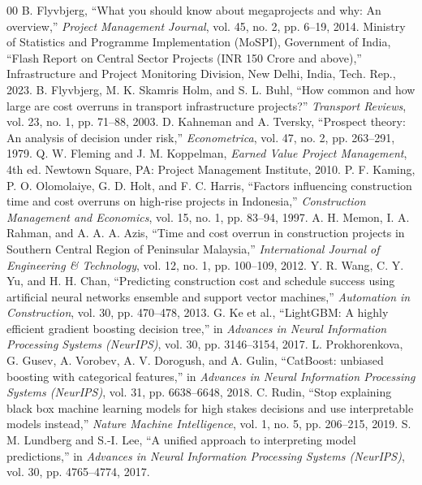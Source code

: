 \documentclass[conference]{IEEEtran}
\begin{document}
\begin{thebibliography}{00}
 B. Flyvbjerg, ``What you should know about megaprojects and why: An overview,'' \textit{Project Management Journal}, vol. 45, no. 2, pp. 6--19, 2014.
 Ministry of Statistics and Programme Implementation (MoSPI), Government of India, ``Flash Report on Central Sector Projects (INR 150 Crore and above),'' Infrastructure and Project Monitoring Division, New Delhi, India, Tech. Rep., 2023.
 B. Flyvbjerg, M. K. Skamris Holm, and S. L. Buhl, ``How common and how large are cost overruns in transport infrastructure projects?'' \textit{Transport Reviews}, vol. 23, no. 1, pp. 71--88, 2003.
 D. Kahneman and A. Tversky, ``Prospect theory: An analysis of decision under risk,'' \textit{Econometrica}, vol. 47, no. 2, pp. 263--291, 1979.
 Q. W. Fleming and J. M. Koppelman, \textit{Earned Value Project Management}, 4th ed. Newtown Square, PA: Project Management Institute, 2010.
 P. F. Kaming, P. O. Olomolaiye, G. D. Holt, and F. C. Harris, ``Factors influencing construction time and cost overruns on high-rise projects in Indonesia,'' \textit{Construction Management and Economics}, vol. 15, no. 1, pp. 83--94, 1997.
 A. H. Memon, I. A. Rahman, and A. A. A. Azis, ``Time and cost overrun in construction projects in Southern Central Region of Peninsular Malaysia,'' \textit{International Journal of Engineering \& Technology}, vol. 12, no. 1, pp. 100--109, 2012.
 Y. R. Wang, C. Y. Yu, and H. H. Chan, ``Predicting construction cost and schedule success using artificial neural networks ensemble and support vector machines,'' \textit{Automation in Construction}, vol. 30, pp. 470--478, 2013.
 G. Ke et al., ``LightGBM: A highly efficient gradient boosting decision tree,'' in \textit{Advances in Neural Information Processing Systems (NeurIPS)}, vol. 30, pp. 3146--3154, 2017.
 L. Prokhorenkova, G. Gusev, A. Vorobev, A. V. Dorogush, and A. Gulin, ``CatBoost: unbiased boosting with categorical features,'' in \textit{Advances in Neural Information Processing Systems (NeurIPS)}, vol. 31, pp. 6638--6648, 2018.
 C. Rudin, ``Stop explaining black box machine learning models for high stakes decisions and use interpretable models instead,'' \textit{Nature Machine Intelligence}, vol. 1, no. 5, pp. 206--215, 2019.
 S. M. Lundberg and S.-I. Lee, ``A unified approach to interpreting model predictions,'' in \textit{Advances in Neural Information Processing Systems (NeurIPS)}, vol. 30, pp. 4765--4774, 2017.

\end{thebibliography}
\end{document}
